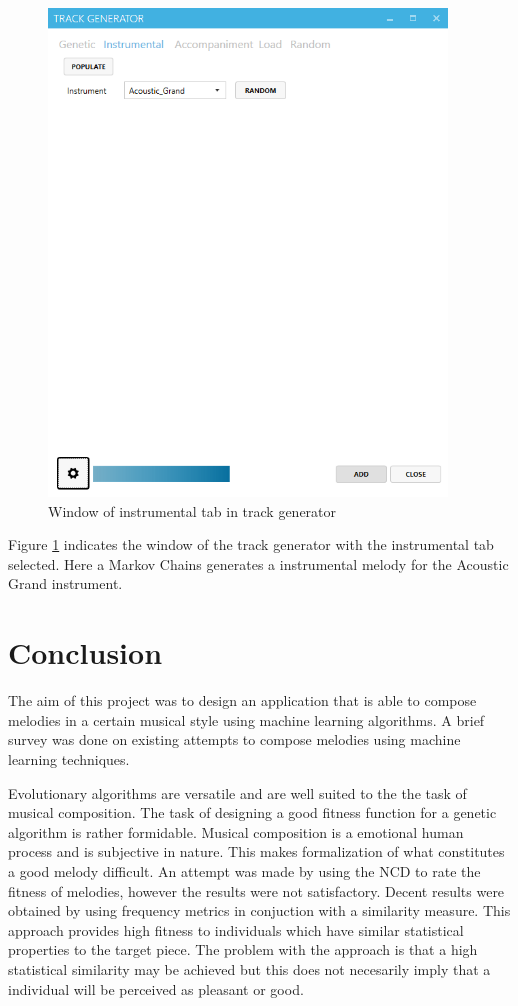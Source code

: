 \begin{figure}
\centerline{\includegraphics[width=400px]{../images/res_ui_track_generator_instr.png}}
\caption{Window of instrumental tab in track generator}
\label{ims:uitrackgeninstr}
\end{figure}

Figure \ref{ims:uitrackgeninstr} indicates the window of the track generator with the instrumental tab selected. Here a Markov Chains generates a instrumental melody for the Acoustic Grand instrument.


\chapter{Conclusion}
The aim of this project was to design an application that is able to compose melodies in a certain musical style using machine learning algorithms. A brief survey was done on existing attempts to compose melodies using machine learning techniques.

Evolutionary algorithms are versatile and are well suited to the the task of musical composition. The task of designing a good fitness function for a genetic algorithm is rather formidable.
Musical composition is a emotional human process and is subjective in nature. This makes formalization of what constitutes a good melody difficult. 
An attempt was made by using the \ac{NCD} to rate the fitness of melodies, however the results were not satisfactory.
Decent results were obtained by using frequency metrics in conjuction with a similarity measure. This approach provides high fitness to individuals which have similar statistical properties to the target piece. The problem with the approach is that a high statistical similarity may be achieved but this does not necesarily imply that a individual will be perceived as pleasant or good.

